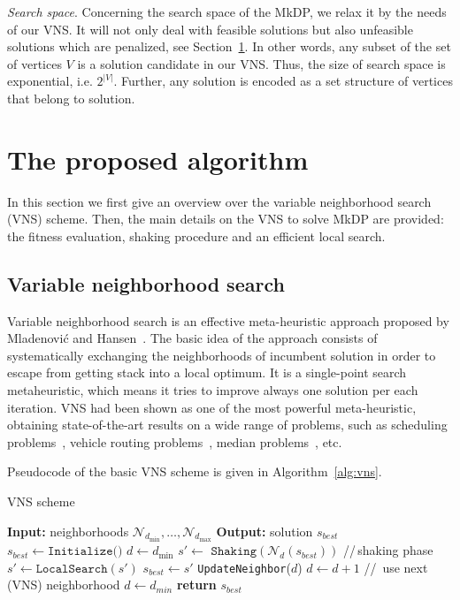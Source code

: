 \documentclass[dvipsnames,format=sigconf,anonymous=true,review=true]{acmart}
\begin{document}
\emph{Search space}.    Concerning the search space of the MkDP, we relax it by the needs of our VNS. It will not only deal with feasible solutions but also unfeasible solutions  which are  penalized, see Section~\ref{sec:vns}.  In other words, any subset of the set of vertices $V$ is a solution candidate in our VNS. Thus, the size of search space is exponential, i.e. $2^{|V|}$.  Further, any solution is encoded as a set structure of vertices that belong to solution. 
   
   
\section{The proposed algorithm}\label{sec:vns}

In this section we first give an overview over the variable neighborhood search (VNS) scheme. Then, the main details on the VNS to solve MkDP are provided: the fitness evaluation, shaking procedure and an efficient local search.
 
  \subsection{Variable neighborhood search}
 Variable neighborhood search is an effective meta-heuristic approach proposed by Mladenović and Hansen~\cite{mladenovic1997variable}. The basic idea of the approach consists of systematically exchanging the neighborhoods of incumbent solution in order to escape from getting stack into a  local optimum. It is a single-point search metaheuristic, which means it tries to improve always one solution per each iteration. VNS had been shown as one of the most powerful meta-heuristic, obtaining state-of-the-art results on a wide range of problems, such as scheduling problems~\cite{fleszar2004solving}, vehicle routing problems~\cite{rezgui2019application}, median problems~\cite{herran2019variable}, etc.  
  
  Pseudocode of the basic VNS scheme is given in Algorithm~\ref{alg:vns}.
  
     \begin{algorithm}[!t] 
  	\caption{VNS scheme}\label{alg:vns}
  	\begin{algorithmic}[1]
  		\STATE \textbf{Input:} neighborhoods  $\mathcal{N}_{d_{\min}},\ldots, \mathcal{N}_{d_{\max}}$ 
  		\STATE \textbf{Output:}   solution $s_{best}$
  		\STATE  $s_{best} \gets \texttt{Initialize()}$ 
  		\STATE $d \gets  d_{\min}$
  		\STATE  $s' \gets$  $\texttt{Shaking}(\mathcal{N}_d(s_{best}))$ \hspace{0.3cm}//\,shaking phase
  		\STATE $s' \gets  \texttt{LocalSearch}(s {'})$
  	    \STATE $s _{best}\gets s'$
  	 	\STATE \texttt{UpdateNeighbor}($d$) %
  		\ELSE 
  		\STATE $d \gets d + 1$ \hspace{0.3cm}//\, use next (VNS) neighborhood
  		\STATE $d\gets d_{min}$
  		\ENDIF
  		\ENDIF
  		\ENDWHILE
  		\STATE \textbf{return} $s_{best}$
  	\end{algorithmic}
  \end{algorithm}
\end{document}
